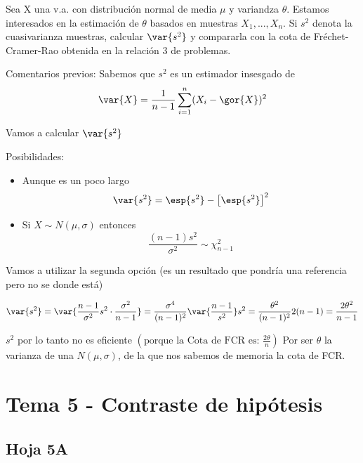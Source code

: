 \begin{problem}[9]
Sea X una v.a. con distribución normal de media $\mu$ y variandza $\theta$. Estamos interesados en la estimación de $\theta$ basados en muestras $X_1,...,X_n$. Si $s^2$ denota la cuasivarianza muestras, calcular $\var{s^2}$ y compararla con la cota de Fréchet-Cramer-Rao obtenida en la relación 3 de problemas.
\solution

Comentarios previos: Sabemos que $s^2$ es un estimador insesgado de \[\var{X} = \frac{1}{n-1} \sum_{i=1}^n (X_i - \gor{X})^2\]

Vamos a calcular $\var{s^2}$

Posibilidades:
\begin{itemize}
\item Aunque es un poco largo\[
\var{s^2} = \esp{s^2}-\left[\esp{s^2}\right]^2
\]

\item Si $X\sim N(\mu,\sigma)$ entonces \[\frac{(n-1)s^2}{\sigma^2} \sim \chi_{n-1}^2\]
\end{itemize}

Vamos a utilizar la segunda opción (es un resultado que pondría una referencia pero no se donde está)

\[
\var{s^2} = \var{\frac{n-1}{\sigma^2}s^2\cdot\frac{\sigma^2}{n-1}} = \frac{\sigma^4}{(n-1)^2} \var{\frac{n-1}{s^2}} s^2 = \frac{\theta^2}{(n-1)^2}2(n-1) = \frac{2\theta^2}{n-1} \]

$s^2$ por lo tanto no es eficiente $\left( \text{porque la Cota de FCR es: } \displaystyle\frac{2\theta}{n}\right)$ Por ser $\theta$ la varianza de una $N(\mu,\sigma)$, de la que nos sabemos de memoria la cota de FCR.


\end{problem}

\section{Tema 5 - Contraste de hipótesis}
\subsection{Hoja 5A}

